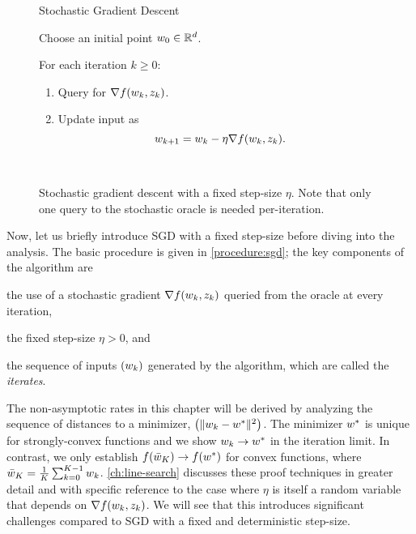 \begin{figure}[t]
\begin{procedure}{Stochastic Gradient Descent}
\item Choose an initial point \( w_0 \in \mathbb{R}^d \).
\item For each iteration \( k \geq 0 \):
    \begin{enumerate}
        \item Query \oracle{} for \( \nabla f(w_k, z_{k}) \).
        \item Update input as\vspace{-1ex}%
            \[ w_{k+1} = w_k - \eta \nabla f(w_k, z_{k}). \]
    \end{enumerate}
\end{procedure}
\caption[Procedural definition of stochastic gradient descent with a fixed step-size.]%
        {Stochastic gradient descent with a fixed step-size \( \eta \). 
         Note that only one query to the stochastic oracle is needed per-iteration.}~\label{procedure:sgd}
\end{figure}

Now, let us briefly introduce \ac{SGD} with a fixed step-size before diving into the analysis.
The basic procedure is given in \autoref{procedure:sgd}; the key components of the algorithm are %
\begin{inparaenum}[(i)] 
    \item the use of a stochastic gradient \( \nabla f(w_k, z_{k}) \) queried from the oracle at every iteration,
    \item the fixed step-size \( \eta > 0 \), and
    \item the sequence of inputs \( \left(w_k\right) \) generated by the algorithm, which are called the \emph{iterates}. 
\end{inparaenum}
The non-asymptotic rates in this chapter will be derived by analyzing the sequence of distances to a minimizer, \( \left(\|w_k - w^*\|^2\right) \). 
The minimizer \( w^* \) is unique for strongly-convex functions and we show \( w_k \rightarrow w^* \) in the iteration limit. 
In contrast, we only establish \( f(\bar {w}_K) \rightarrow f(w^*) \) for convex functions, where \( \bar {w}_K  = \frac{1}{K}\sum_{k=0}^{K-1} w_k \).
\autoref{ch:line-search} discusses these proof techniques in greater detail and with specific reference to the case where \( \eta \) is itself a random variable that depends on \( \nabla f(w_k, z_{k}) \).
We will see that this introduces significant challenges compared to \ac{SGD} with a fixed and deterministic step-size.\\

